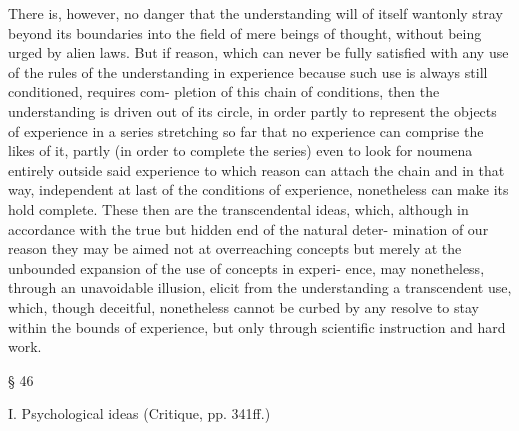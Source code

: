 There is, however, no danger that the understanding will of itself
wantonly stray beyond its boundaries into the ﬁeld of mere beings of
thought, without being urged by alien laws. But if reason, which can
never be fully satisﬁed with any use of the rules of the understanding in
experience because such use is always still conditioned, requires com-
pletion of this chain of conditions, then the understanding is driven out
of its circle, in order partly to represent the objects of experience in a
series stretching so far that no experience can comprise the likes of it,
partly (in order to complete the series) even to look for noumena entirely
outside said experience to which reason can attach the chain and in that
way, independent at last of the conditions of experience, nonetheless can
make its hold complete. These then are the transcendental ideas, which,
although in accordance with the true but hidden end of the natural deter-
mination of our reason they may be aimed not at overreaching concepts
but merely at the unbounded expansion of the use of concepts in experi-
ence, may nonetheless, through an unavoidable illusion, elicit from the
understanding a transcendent use, which, though deceitful, nonetheless
cannot be curbed by any resolve to stay within the bounds of experience,
but only through scientiﬁc instruction and hard work.

§ 46

I. Psychological ideas (Critique, pp. 341ff.)

